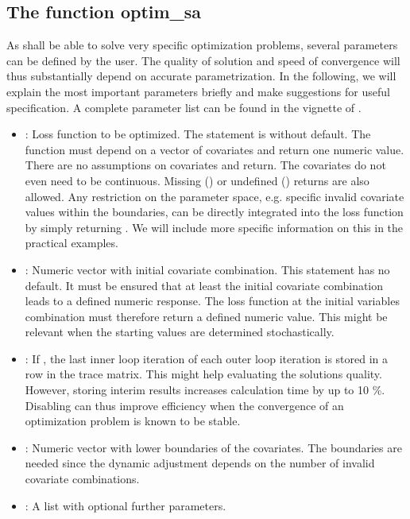 \subsection{The function optim\_sa}
As  shall be able to solve very specific optimization problems, several parameters can be defined by the user. The quality of solution and speed of convergence will thus substantially depend on accurate parametrization. In the following, we will explain the most important parameters briefly and make suggestions for useful specification. A complete parameter list can be found in the vignette of .
\begin{itemize}
\item {}: Loss function to be optimized. The statement is without default. The function must depend on a vector of covariates and return one numeric value. There are no assumptions on covariates and return. The covariates do not even need to be continuous. Missing () or undefined () returns are also allowed. Any restriction on the parameter space, e.g. specific invalid covariate values within the boundaries, can be directly integrated into the loss function by simply returning . We will include more specific information on this in the practical examples.
\item {}: Numeric vector with initial covariate combination. This statement has no default. It must be ensured that at least the initial covariate combination leads to a defined numeric response. The loss function at the initial variables combination must therefore return a defined numeric value. This might be relevant when the starting values are determined stochastically.
\item {}: If , the last inner loop iteration of each outer loop iteration is stored in a row in the trace matrix. This might help evaluating the solutions quality. However, storing interim results increases calculation time by up to 10 \%. Disabling  can thus improve efficiency when the convergence of an optimization problem is known to be stable.
\item {}: Numeric vector with lower boundaries of the covariates. The boundaries are needed since the dynamic  adjustment \citep{corana_1987, pronzato_1984} depends on the number of invalid covariate combinations.
\item {}: A list with optional further parameters.
\end{itemize}
